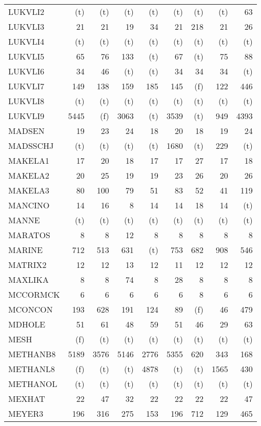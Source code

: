 \documentclass[11pt,twoside]{article}
\begin{document}
{\begin{longtable}[c]{|l|r|r|r|r|r|r|r|r|}
 LUKVLI2 & (t) & (t) & (t) & (t) & (t) & (t) & (t) & 63 \\
 LUKVLI3 & 21 & 21 & 19 & 34 & 21 & 218 & 21 & 26 \\
 LUKVLI4 & (t) & (t) & (t) & (t) & (t) & (t) & (t) & (t) \\
 LUKVLI5 & 65 & 76 & 133 & (t) & 67 & (t) & 75 & 88 \\
 LUKVLI6 & 34 & 46 & (t) & (t) & 34 & 34 & 34 & (t) \\
 LUKVLI7 & 149 & 138 & 159 & 185 & 145 & (f) & 122 & 446 \\
 LUKVLI8 & (t) & (t) & (t) & (t) & (t) & (t) & (t) & (t) \\
 LUKVLI9 & 5445 & (f) & 3063 & (t) & 3539 & (t) & 949 & 4393 \\
 MADSEN & 19 & 23 & 24 & 18 & 20 & 18 & 19 & 24 \\
 MADSSCHJ & (t) & (t) & (t) & (t) & 1680 & (t) & 229 & (t) \\
 MAKELA1 & 17 & 20 & 18 & 17 & 17 & 27 & 17 & 18 \\
 MAKELA2 & 20 & 25 & 19 & 19 & 23 & 26 & 20 & 26 \\
 MAKELA3 & 80 & 100 & 79 & 51 & 83 & 52 & 41 & 119 \\
 MANCINO & 14 & 16 & 8 & 14 & 14 & 18 & 14 & (t) \\
 MANNE & (t) & (t) & (t) & (t) & (t) & (t) & (t) & (t) \\
 MARATOS & 8 & 8 & 12 & 8 & 8 & 8 & 8 & 8 \\
 MARINE & 712 & 513 & 631 & (t) & 753 & 682 & 908 & 546 \\
 MATRIX2 & 12 & 12 & 13 & 12 & 11 & 12 & 12 & 12 \\
 MAXLIKA & 8 & 8 & 74 & 8 & 28 & 8 & 8 & 8 \\
 MCCORMCK & 6 & 6 & 6 & 6 & 6 & 8 & 6 & 6 \\
 MCONCON & 193 & 628 & 191 & 124 & 89 & (f) & 46 & 479 \\
 MDHOLE & 51 & 61 & 48 & 59 & 51 & 46 & 29 & 63 \\
 MESH & (f) & (t) & (t) & (t) & (t) & (t) & (t) & (t) \\
 METHANB8 & 5189 & 3576 & 5146 & 2776 & 5355 & 620 & 343 & 168 \\
 METHANL8 & (f) & (t) & (t) & 4878 & (t) & (t) & 1565 & 430 \\
 METHANOL & (t) & (t) & (t) & (t) & (t) & (t) & (t) & (t) \\
 MEXHAT & 22 & 47 & 32 & 22 & 22 & 22 & 22 & 47 \\
 MEYER3 & 196 & 316 & 275 & 153 & 196 & 712 & 129 & 465 \\

\end{longtable}}
\end{document}
